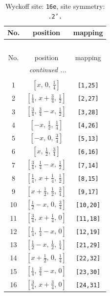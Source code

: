 \documentclass[fleqn,8pt]{jsarticle}
\begin{document}
\renewcommand{\arraystretch}{1.2}
\begin{longtable}{ccc}
\caption{Wyckoff site: {\tt 16e}, site symmetry: {\tt .2'.}}
 \\
 \hline \hline
No. & position & mapping \\ \hline \endfirsthead

\multicolumn{2}{l}{\tablename\ \thetable{}} \\
 \hline \hline
No. & position & mapping \\ \hline \endhead

 \hline \hline
\multicolumn{2}{r}{\footnotesize\it continued ...} \\ \endfoot

 \hline \hline
\multicolumn{2}{r}{} \\ \endlastfoot

1 & $\left[ x,\, 0,\, \frac{1}{4} \right]$ & {\tt [1,25]} \\ \hline
2 & $\left[ \frac{1}{4},\, x + \frac{3}{4},\, \frac{1}{2} \right]$ & {\tt [2,27]} \\ \hline
3 & $\left[ \frac{3}{4},\, \frac{3}{4} - x,\, \frac{1}{2} \right]$ & {\tt [3,28]} \\ \hline
4 & $\left[ - x,\, \frac{1}{2},\, \frac{1}{4} \right]$ & {\tt [4,26]} \\ \hline
5 & $\left[ - x,\, 0,\, \frac{3}{4} \right]$ & {\tt [5,13]} \\ \hline
6 & $\left[ x,\, \frac{1}{2},\, \frac{3}{4} \right]$ & {\tt [6,16]} \\ \hline
7 & $\left[ \frac{3}{4},\, \frac{1}{4} - x,\, \frac{1}{2} \right]$ & {\tt [7,14]} \\ \hline
8 & $\left[ \frac{1}{4},\, x + \frac{1}{4},\, \frac{1}{2} \right]$ & {\tt [8,15]} \\ \hline
9 & $\left[ x + \frac{1}{2},\, \frac{1}{2},\, \frac{3}{4} \right]$ & {\tt [9,17]} \\ \hline
10 & $\left[ \frac{1}{2} - x,\, 0,\, \frac{3}{4} \right]$ & {\tt [10,20]} \\ \hline
11 & $\left[ \frac{3}{4},\, x + \frac{1}{4},\, 0 \right]$ & {\tt [11,18]} \\ \hline
12 & $\left[ \frac{1}{4},\, \frac{1}{4} - x,\, 0 \right]$ & {\tt [12,19]} \\ \hline
13 & $\left[ \frac{1}{2} - x,\, \frac{1}{2},\, \frac{1}{4} \right]$ & {\tt [21,29]} \\ \hline
14 & $\left[ x + \frac{1}{2},\, 0,\, \frac{1}{4} \right]$ & {\tt [22,32]} \\ \hline
15 & $\left[ \frac{1}{4},\, \frac{3}{4} - x,\, 0 \right]$ & {\tt [23,30]} \\ \hline
16 & $\left[ \frac{3}{4},\, x + \frac{3}{4},\, 0 \right]$ & {\tt [24,31]} \\
\end{longtable}
\end{document}
